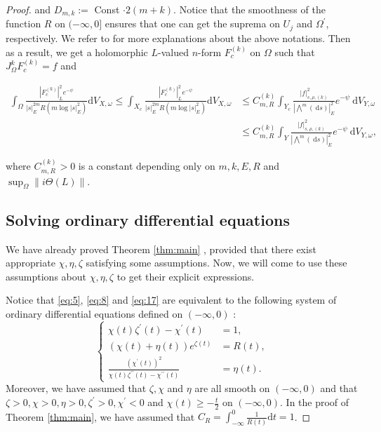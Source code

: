 \documentclass[lang=en,12pt,twoside]{textbook}
\begin{document}
\begin{proof}
and $D_{m, k}:=$ Const $\cdot 2(m+k)$. Notice that the smoothness of the function $R$ on $(-\infty, 0]$ ensures that one can get the suprema on $U_j$ and $\Omega^{\prime}$, respectively. We refer to \cite[Section 0.4]{Popovici2004L2EF} for more explanations about the above notations.
Then as a result, we get a holomorphic $L$-valued $n$-form $F_{c}^{(k)}$ on $\Omega$ such that $J_{\Omega}^k F_{c}^{(k)}=f$ and
 \begin{fulleq}
 $$
 \begin{aligned}
 \int_{\Omega} \frac{\left|F_{c}^{(k)}\right|_{L}^2 e^{-\psi}}{|s|_E^{2 m} R\left(m \log |s|_E^2\right)} \mathrm{d} V_{X, \omega}  \leq \int_{X_c} \frac{\left|F_{c}^{(k)}\right|_{L}^2 e^{-\psi}}{|s|_E^{2 m} R\left(m \log |s|_E^2\right)} \mathrm{d} V_{X, \omega} 
 & \leq C_{m, R}^{(k)} \int_{Y_c} \frac{|f|_{s, \rho,(k)}^2}{\left|\bigwedge^m(\mathrm{~d} s)\right|_E^2} e^{-\psi}\mathrm{~d} V_{Y, \omega} \\
 & \leq C_{m, R}^{(k)} \int_Y \frac{|f|_{s, \rho,(k)}^2}{\left|\bigwedge^m(\mathrm{~d} s)\right|_E^2}  e^{-\psi}\mathrm{~d} V_{Y, \omega},
 \end{aligned}
 $$
\end{fulleq}
where $C_{m, R}^{(k)}>0$ is a constant depending only on $m, k, E, R$ and $\sup _{\Omega}\|i \Theta(L)\|$.

\subsection{Solving ordinary differential equations}

We have already proved Theorem \ref{thm:main} , provided that there exist appropriate $\chi, \eta, \zeta$ satisfying some assumptions. Now, we will come to use these assumptions about $\chi, \eta, \zeta$ to get their explicit expressions.

Notice that \eqref{eq:5}, \eqref{eq:8} and \eqref{eq:17} are equivalent to the following system of ordinary differential equations defined on $(-\infty, 0)$ :
$$
\left\{
\begin{aligned}
\chi(t) \zeta^{\prime}(t)-\chi^{\prime}(t) &=1, \\
(\chi(t)+\eta(t)) e^{\zeta(t)} &=R( t), \\
\frac{\left(\chi^{\prime}(t)\right)^2}{\chi(t) \zeta^{\prime \prime}(t)-\chi^{\prime \prime}(t)} &=\eta(t).
\end{aligned}\right.
$$
 Moreover, we have assumed that $\zeta, \chi$ and $\eta$ are all smooth on $(-\infty, 0)$ and that $\zeta>0, \chi>0, \eta>0, \zeta^{\prime}>0, \chi^{\prime}<0$ and $\chi(t) \geq-\frac{t}{2}$ on $(-\infty, 0)$. In the proof of Theorem \ref{thm:main}, we have assumed that $C_R=\int_{-\infty}^0 \frac{1}{R(t)} \mathrm{d} t=1$. 


\end{proof}
\end{document}
